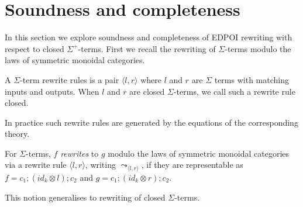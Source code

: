 \section{Soundness and completeness}

In this section we explore soundness and completeness of EDPOI rewriting with respect to closed $\Sigma^{+}$-terms.
First we recall the rewriting of $\Sigma$-terms modulo the laws of symmetric monoidal categories.

\begin{defi}
	A $\Sigma$-term rewrite rules is a pair $\langle l, r \rangle$ where $l$ and $r$ are $\Sigma$ terms with matching inputs and outputs.
	When $l$ and $r$ are closed $\Sigma$-terms, we call such a rewrite rule closed.
\end{defi}

In practice such rewrite rules are generated by the equations of the corresponding theory.

\begin{defi}%
	\label{def:rewrite}
	For $\Sigma$-terms, $f$ \emph{rewrites} to $g$ modulo the laws of symmetric monoidal categories via a rewrite rule $\langle l, r \rangle$, writing $\leadsto_{\langle l, r \rangle}$, if they are representable as
	$
		f = c_{1};(id_{k} \otimes l);c_{2} $ and $ g = c_{1};(id_{k} \otimes r);c_{2}
	$.
\end{defi}
This notion generalises to rewriting of closed $\Sigma$-terms.

